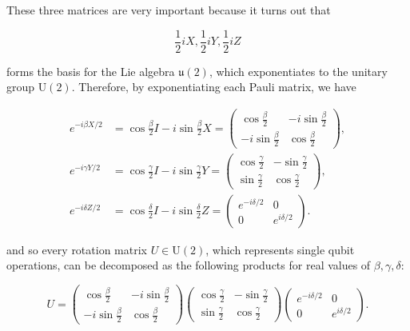 \documentclass{article}
\begin{document}
  \begin{theorem}
    These three matrices are very important because it turns out that

      \[\frac{1}{2} i X, \frac{1}{2} i Y, \frac{1}{2} i Z\]

    forms the basis for the Lie algebra $\mathfrak{u}(2)$, which exponentiates to the unitary group $\text{U}(2)$. Therefore, by exponentiating each Pauli matrix, we have

    \begin{align*}
      e^{-i \beta X /2} &= \cos \frac{\beta}{2} I - i \sin \frac{\beta}{2} X = \begin{pmatrix} \cos \frac{\beta}{2} & -i \sin \frac{\beta}{2} \\ -i \sin \frac{\beta}{2} & \cos \frac{\beta}{2} \end{pmatrix}, \\
      e^{-i \gamma Y/2} &= \cos \frac{\gamma}{2} I - i \sin \frac{\gamma}{2} Y = \begin{pmatrix} \cos \frac{\gamma}{2} & - \sin \frac{\gamma}{2} \\ \sin \frac{\gamma}{2} & \cos \frac{\gamma}{2} \end{pmatrix}, \\
      e^{-i \delta Z/2} &= \cos \frac{\delta}{2} I - i \sin \frac{\delta}{2} Z = \begin{pmatrix} e^{-i \delta /2} & 0 \\ 0 & e^{i\delta/2} \end{pmatrix}.
    \end{align*}

    and so every rotation matrix $U \in \text{U}(2)$, which represents single qubit operations, can be decomposed as the following products for real values of $\beta, \gamma, \delta$:

    \[
      U = \begin{pmatrix} \cos \frac{\beta}{2} & -i \sin \frac{\beta}{2} \\ -i \sin \frac{\beta}{2} & \cos \frac{\beta}{2} \end{pmatrix} \begin{pmatrix} \cos \frac{\gamma}{2} & - \sin \frac{\gamma}{2} \\ \sin \frac{\gamma}{2} & \cos \frac{\gamma}{2} \end{pmatrix} \begin{pmatrix} e^{-i \delta /2} & 0 \\ 0 & e^{i\delta/2} \end{pmatrix}.
    \]
  \end{theorem}
\end{document}
